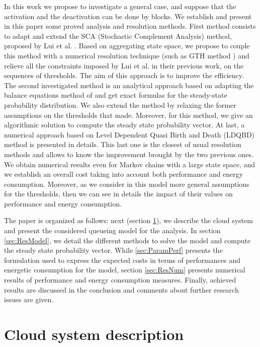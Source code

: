 \documentclass[conference]{IEEEtran}
\begin{document}
In this work we propose to investigate a general case, and suppose that the activation and the deactivation can be done by blocks. We establish and present in this paper some proved analysis and resolution methods.
First method consists to adapt and extend the SCA (Stochastic Complement Analysis) method, proposed by Lui et al. \cite{lui1999stochastic}. Based on aggregating
state space, we propose to couple this method with a numerical resolution technique (such as GTH method \cite{Stew95}) and relieve all the constraints imposed by Lui et al. in their previous work, on the sequences of thresholds. The aim of this approach is to improve the efficiency.
The second investigated method is an analytical approach based on  adapting the balance equations method of \cite{le2000simple} and get exact formulas
for the steady-state probability distribution.
We also extend the method by relaxing the former assumptions on the thresholds that \cite{le2000simple} made. Moreover, for this method, we give an algorithmic solution to compute the steady state probability vector.
At last, a numerical approach based on Level Dependent Quasi Birth and Death (LDQBD) method is presented in details.
This last one is the closest of usual resolution methods
and allows to know the improvement brought by the two previous ones. We obtain numerical results even for Markov chains with a large state space,
and we establish an overall cost taking into account both performance and energy consumption. Moreover, as we consider
in this model more general assumptions for the thresholds, then  we can  see in details the impact of their  values
on performance and energy consumption.


The paper is organized as follows: next (section \ref{sec:ModelDet}), we describe the cloud system and present the considered queueing model
for the analysis. In section \ref{sec:ResModel}, we detail the different methods to solve the model and compute the steady state probability vector.
While \ref{sec:ParamPerf} presents the formulation used to express the expected costs
in terms of performances and energetic consumption for the model,
section \ref{sec:ResNum} presents numerical results of  performance and energy consumption measures. Finally,
achieved results are discussed in the conclusion and comments about further research issues  are given.


\section{Cloud system description} \label{sec:ModelDet}
\end{document}
